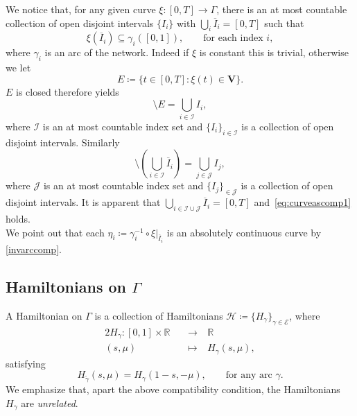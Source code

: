 \documentclass[11pt,a4paper,american]{article}
\newcommand{\Ecal}{\mathcal E}
\newcommand{\Hcal}{\mathcal H}
\newcommand{\ovI}{\overline I}
\newcommand{\Ical}{\mathcal I}
\newcommand{\Jcal}{\mathcal J}
\newcommand{\Rds}{\mathds R}
\newcommand{\Vbf}{\mathbf V}
\newcommand{\wtgamma}{\widetilde\gamma}
\begin{document}
    \begin{rem}\label{curveascomp}
        We notice that, for any given curve $\xi:[0,T]\to\Gamma$, there is an at most countable collection of open disjoint intervals $\{I_i\}$ with $\bigcup_i\ovI_i=[0,T]$ such that
        \begin{equation}\label{eq:curveascomp1}
            \xi\left(\ovI_i\right)\subseteq\gamma_i([0,1]),\qquad\text{for each index }i,
        \end{equation}
        where $\gamma_i$ is an arc of the network. Indeed if $\xi$ is constant this is trivial, otherwise we let
        \begin{equation*}
            E\coloneqq\{t\in[0,T]:\xi(t)\in\Vbf\}.
        \end{equation*}
        $E$ is closed therefore \cite[Theorem 1.9]{DeBarra03} yields
        \begin{equation*}
            [0,T]\setminus E=\bigcup_{i\in\Ical}I_i,
        \end{equation*}
        where $\Ical$ is an at most countable index set and $\{I_i\}_{i\in\Ical}$ is a collection of open disjoint intervals. Similarly
        \begin{equation*}
            [0,T]\setminus\left(\bigcup_{i\in\Ical}\ovI_i\right)=\bigcup_{j\in\Jcal}I_j,
        \end{equation*}
        where $\Jcal$ is an at most countable index set and $\{I_j\}_{\in\Jcal}$ is a collection of open disjoint intervals. It is apparent that $\bigcup\limits_{i\in\Ical\cup\Jcal}\ovI_i=[0,T]$ and~\cref{eq:curveascomp1} holds.\\
        We point out that each $\eta_i\coloneqq\gamma_i^{-1}\circ\xi|_{\ovI_i}$ is an absolutely continuous curve by \cref{invarccomp}.
    \end{rem}

    \subsection{Hamiltonians on \texorpdfstring{$\Gamma$}{Γ}}

    A Hamiltonian on $\Gamma$ is a collection of Hamiltonians $\Hcal\coloneqq\{H_\gamma\}_{\gamma\in\Ecal}$, where
    \begin{alignat*}{2}
        H_\gamma:[0,1]\times\Rds&&\:\longrightarrow\:&\Rds\\
        (s,\mu)&&\:\longmapsto\:&H_\gamma(s,\mu),
    \end{alignat*}
    satisfying
    \begin{equation}\label{eq:condcompH}
        H_{\wtgamma}(s,\mu)=H_\gamma(1-s,-\mu),\qquad\text{for any arc }\gamma.
    \end{equation}
    We emphasize that, apart the above compatibility condition, the Hamiltonians $H_\gamma$ are \emph{unrelated}.
\end{document}
